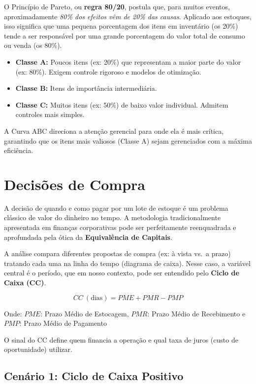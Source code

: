 \documentclass[
  a4paper,
]{book}
\providecommand{\tightlist}{%
  \setlength{\itemsep}{0pt}\setlength{\parskip}{0pt}}\usepackage{longtable,booktabs,array}
\begin{document}
O Princípio de Pareto, ou \textbf{regra 80/20}, postula que, para muitos
eventos, aproximadamente \emph{80\% dos efeitos vêm de 20\% das causas}.
Aplicado aos estoques, isso significa que uma pequena porcentagem dos
itens em inventário (os 20\%) tende a ser responsável por uma grande
porcentagem do valor total de consumo ou venda (os 80\%).

\begin{itemize}
\tightlist
\item
  \textbf{Classe A:} Poucos itens (ex: 20\%) que representam a maior
  parte do valor (ex: 80\%). Exigem controle rigoroso e modelos de
  otimização.
\item
  \textbf{Classe B:} Itens de importância intermediária.
\item
  \textbf{Classe C:} Muitos itens (ex: 50\%) de baixo valor individual.
  Admitem controles mais simples.
\end{itemize}

A Curva ABC direciona a atenção gerencial para onde ela é mais crítica,
garantindo que os itens mais valiosos (Classe A) sejam gerenciados com a
máxima eficiência.

\section{Decisões de Compra}\label{decisuxf5es-de-compra}

A decisão de quando e como pagar por um lote de estoque é um problema
clássico de valor do dinheiro no tempo. A metodologia tradicionalmente
apresentada em finanças corporativas pode ser perfeitamente reenquadrada
e aprofundada pela ótica da \textbf{Equivalência de Capitais}.

A análise compara diferentes propostas de compra (ex: à vista vs.~a
prazo) tratando cada uma na linha do tempo (diagrama de caixa). Nesse
caso, a variável central é o período, que em nosso contexto, pode ser
entendido pelo \textbf{Ciclo de Caixa (CC)}.

\[
CC~(\text{dias}) = PME + PMR - PMP
\]

Onde: \(PME\): Prazo Médio de Estocagem, \(PMR\): Prazo Médio de
Recebimento e \(PMP\): Prazo Médio de Pagamento

O sinal do CC define quem financia a operação e qual taxa de juros
(custo de oportunidade) utilizar.

\subsection{Cenário 1: Ciclo de Caixa
Positivo}\label{cenuxe1rio-1-ciclo-de-caixa-positivo}
\end{document}
